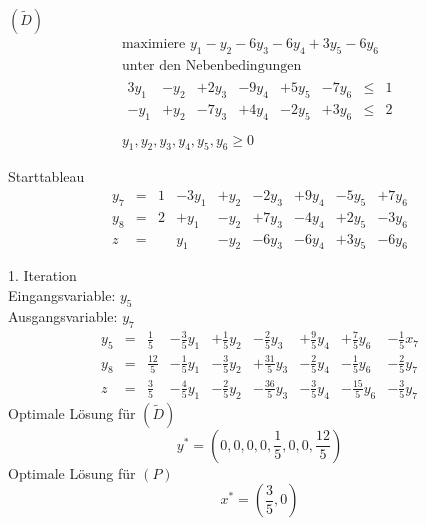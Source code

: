 \documentclass[a4paper]{scrartcl}
\begin{document}
\begin{enumerate}[label=\bfseries\arabic*.]
        $(\tilde D)$
        \begin{equation}
            \begin{gathered}
                \text{maximiere } y_1 -y_2 -6y_3 -6y_4 +3y_5 -6y_6 \\
                \text{unter den Nebenbedingungen} \\
                \begin{array}{rrrrrrcr}
                    3y_1 & -y_2 & +2y_3 & -9y_4 & +5y_5 & -7y_6 & \leq & 1 \\
                    -y_1 & +y_2 & -7y_3 & +4y_4 & -2y_5 & +3y_6 & \leq & 2 \\
                \end{array} \\
                y_1, y_2, y_3, y_4, y_5, y_6 \geq 0
            \end{gathered}
        \end{equation}

        Starttableau
        \begin{equation}
            \begin{array}{rcrrrrrrr}
                y_7 & = & 1 & -3y_1 & +y_2 & -2y_3 & +9y_4 & -5y_5 & +7y_6 \\
                y_8 & = & 2 & +y_1 & -y_2 & +7y_3 & -4y_4 & +2y_5 & -3y_6 \\
                \hline
                z & = & & y_1 & -y_2 & -6y_3 & -6y_4 & +3y_5 & -6y_6
            \end{array}
        \end{equation}

        1. Iteration \\
        Eingangsvariable: $y_5$ \\
        Ausgangsvariable: $y_7$
        \begin{equation}
            \begin{array}{rcrrrrrrr}
                y_5 & = & \frac{1}{5} & -\frac{3}{5}y_1 & +\frac{1}{5}y_2 & -\frac{2}{5}y_3 & +\frac{9}{5}y_4 & +\frac{7}{5}y_6 & -\frac{1}{5}x_7 \\
                y_8 & = & \frac{12}{5} & -\frac{1}{5}y_1 & -\frac{3}{5}y_2 & +\frac{31}{5}y_3 & -\frac{2}{5}y_4 & -\frac{1}{5}y_6 & -\frac{2}{5}y_7 \\
                \hline
                z & = & \frac{3}{5} & -\frac{4}{5}y_1 & -\frac{2}{5}y_2 & -\frac{36}{5}y_3 & -\frac{3}{5}y_4 & -\frac{15}{5}y_6 & -\frac{3}{5}y_7
            \end{array}
        \end{equation}
        Optimale Lösung für $(\tilde D)$ \\
        \begin{equation}
            y^* = \left( 0, 0, 0, 0, \frac{1}{5}, 0, 0, \frac{12}{5} \right)
        \end{equation}
        Optimale Lösung für $(P)$ \\
        \begin{equation}
            x^* = \left( \frac{3}{5}, 0 \right)
        \end{equation}

\end{enumerate}
\end{document}
